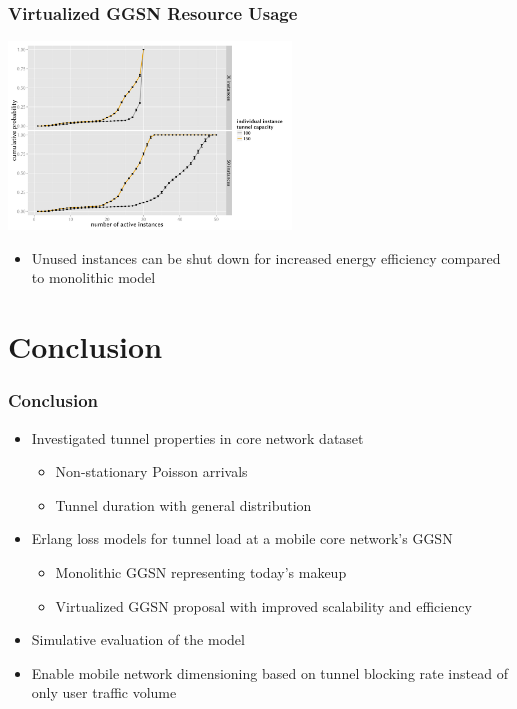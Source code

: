 \documentclass{beamer}
\begin{document}
\begin{frame}
	\frametitle{Virtualized GGSN Resource Usage}

	\begin{center}
		\includegraphics[height=5cm]{../../chapters/04-mobilenets/images/R-virtualized-instanceuse.pdf}
	\end{center}

	\begin{itemize}
		\item Unused instances can be shut down for increased energy efficiency compared to monolithic model
	\end{itemize}
\end{frame}




\section{Conclusion}

\begin{frame}
	\frametitle{Conclusion}

	\begin{itemize}
		\item Investigated tunnel properties in core network dataset

		\begin{itemize}
			\item Non-stationary Poisson arrivals
			\item Tunnel duration with general distribution
		\end{itemize}

		\item Erlang loss models for tunnel load at a mobile core network's GGSN
		\begin{itemize}
			\item Monolithic GGSN representing today's makeup
			\item Virtualized GGSN proposal with improved scalability and efficiency
		\end{itemize}

		\item Simulative evaluation of the model

		\item Enable mobile network dimensioning based on tunnel blocking rate instead of only user traffic volume


	\end{itemize}

\end{frame}
\end{document}
